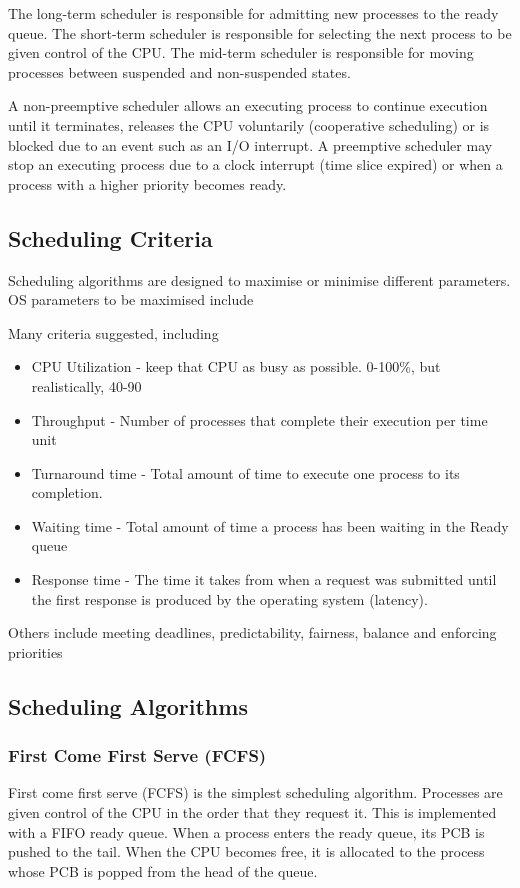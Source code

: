 The long-term scheduler is responsible for admitting new processes to the ready queue.
The short-term scheduler is responsible for selecting the next process to be given control of the CPU\@.
The mid-term scheduler is responsible for moving processes between suspended and non-suspended states.

A non-preemptive scheduler allows an executing process to continue execution until it terminates, releases the CPU voluntarily (cooperative scheduling) or is blocked due to an event such as an I/O interrupt.
A preemptive scheduler may stop an executing process due to a clock interrupt (time slice expired) or when a process with a higher priority becomes ready.

\subsection{Scheduling Criteria}

Scheduling algorithms are designed to maximise or minimise different parameters.
OS parameters to be maximised include

Many criteria suggested, including
\begin{itemize}
\item CPU Utilization - keep that CPU as busy as possible. 0-100\%, but realistically, 40-90%
\item Throughput - Number of processes that complete their execution per time unit
\item Turnaround time - Total amount of time to execute one process to its completion.
\item Waiting time - Total amount of time a process has been waiting in the Ready queue
\item Response time - The time it takes from when a request was submitted until the first response is produced by the operating system (latency).
\end{itemize}
Others include meeting deadlines, predictability, fairness, balance and enforcing priorities


\subsection{Scheduling Algorithms}

\subsubsection{First Come First Serve (FCFS)}

First come first serve (FCFS) is the simplest scheduling algorithm.
Processes are given control of the CPU in the order that they request it.
This is implemented with a FIFO ready queue.
When a process enters the ready queue, its PCB is pushed to the tail.
When the CPU becomes free, it is allocated to the process whose PCB is popped from the head of the queue.

